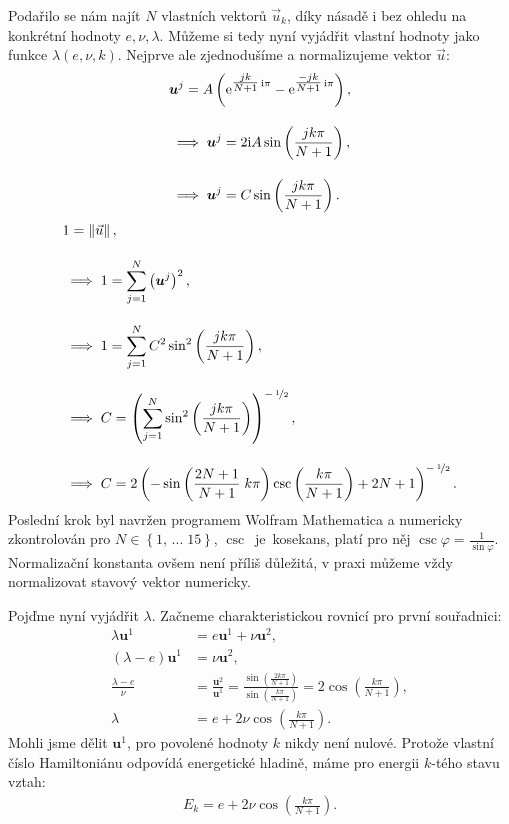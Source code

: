 \documentclass[10pt,a4paper]{article}
\newcommand{\const}[1]{\text{\rmfamily\upshape #1}}
\newcommand{\norm}[1]{\left\lVert#1\right\rVert}
\newcommand{\e}[1]{\const{e}^{#1}}
\renewcommand{\i}{\const{i}}
\begin{document}
Podařilo se nám najít $N$ vlastních vektorů $\vec{u}_k$, díky násadě i bez ohledu na konkrétní hodnoty $e, \nu, \lambda$. Můžeme si tedy nyní vyjádřit vlastní hodnoty jako funkce $\lambda(e, \nu, k)$. Nejprve ale zjednodušíme a normalizujeme vektor $\vec{u}$:
\begin{align*}
    &\bm{u}^j = A \left( \e{\tfrac{jk}{N+1}\, \i\pi} - \e{\tfrac{-jk}{N+1}\, \i\pi} \right),
    \\[10pt]
    &\implies \bm{u}^j = 2 \i A \sin \left( \frac{jk\pi}{N+1} \right),
    \\[10pt]
    &\implies \bm{u}^j = C \sin \left( \frac{jk\pi}{N+1} \right).
    \\
\end{align*}
\begin{align*}
    &1 = \norm{ \vec{u} },
    \\[10pt]
    &\implies 1 = \sum_{j=1}^N \left(\bm{u}^j\right)^2,
    \\[10pt]
    &\implies 1 = \sum_{j=1}^N C^2 \sin^2 \left( \frac{jk\pi}{N+1} \right),
    \\[10pt]
    &\implies C = \left( \sum_{j=1}^N \sin^2 \left( \frac{jk\pi}{N+1} \right) \right)^{-\,\nicefrac{1}{2}},
    \\[10pt]
    &\implies C = 2  \left(
        -\sin \left( \frac{ 2N + 1 }{N + 1} \; k \pi \right) \csc \left( \frac{ k \pi }{N + 1} \right) + 2N + 1
    \right)^{-\,\nicefrac{1}{2}}.
\end{align*}
Poslední krok byl navržen programem Wolfram Mathematica a numericky zkontrolován pro $N \in \left\{ 1, \, ... \; 15 \right\}$, $\csc$~je~kosekans, platí pro něj $\csc \varphi = \frac{1}{\sin \varphi}$. Normalizační konstanta ovšem není příliš důležitá, v praxi můžeme vždy normalizovat stavový vektor numericky.

Pojďme nyní vyjádřit $\lambda$. Začneme charakteristickou rovnicí pro první souřadnici:
\begin{align*}
    \lambda \bm{u}^1 &= e \bm{u}^1 + \nu \bm{u}^2,
    \\[10pt]
    \left( \lambda - e \right) \bm{u}^1 &= \nu \bm{u}^2,
    \\[10pt]
    \frac{\lambda - e}{\nu} &= \frac{\bm{u}^2}{\bm{u}^1}
    = \frac{ \sin\left(\frac{2k \pi}{N+1}\right) }{ \sin\left(\frac{k \pi}{N+1}\right) }
    = 2 \cos\left( \frac{k\pi}{N+1} \right),
    \\[10pt]
    \lambda &= e + 2\nu \cos\left( \frac{k\pi}{N+1} \right).
\end{align*}
Mohli jsme dělit $\bm{u}^1$, pro povolené hodnoty $k$ nikdy není nulové. Protože vlastní číslo Hamiltoniánu odpovídá energetické hladině, máme pro energii $k$-tého stavu vztah:
\begin{align*}
    E_k = e + 2 \nu \cos\left(\frac{k\pi}{N+1}\right).
\end{align*}
\end{document}
